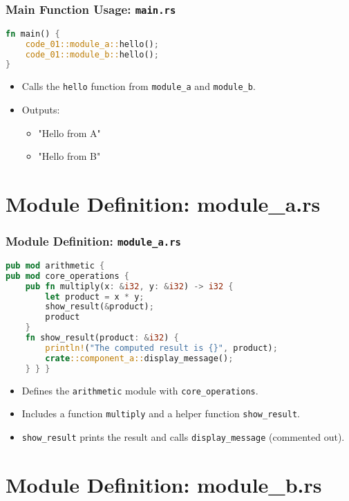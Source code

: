 \documentclass[aspectratio=169, table]{beamer}
\begin{document}
\begin{frame}[fragile]
\frametitle{Main Function Usage: \texttt{main.rs}}
\begin{lstlisting}[language=Rust]
fn main() { 
	code_01::module_a::hello();
	code_01::module_b::hello(); 
}
\end{lstlisting}
\begin{itemize}
\item Calls the \texttt{hello} function from \texttt{module\_a} and \texttt{module\_b}.
\item Outputs:
\begin{itemize}
	\item "Hello from A"
	\item "Hello from B"
\end{itemize}
\end{itemize}
\end{frame}

\section{Module Definition: module\_a.rs}
\begin{frame}[fragile]
\frametitle{Module Definition: \texttt{module\_a.rs}}
\vspace{15pt}
\begin{lstlisting}[language=Rust]
pub mod arithmetic {
pub mod core_operations {
	pub fn multiply(x: &i32, y: &i32) -> i32 {
		let product = x * y;
		show_result(&product);
		product
	}
	fn show_result(product: &i32) {
		println!("The computed result is {}", product);
		crate::component_a::display_message();
	} } }
\end{lstlisting}
\begin{itemize}
\item Defines the \texttt{arithmetic} module with \texttt{core\_operations}.
\item Includes a function \texttt{multiply} and a helper function \texttt{show\_result}.
\item \texttt{show\_result} prints the result and calls \texttt{display\_message} (commented out).
\end{itemize}
\end{frame}

\section{Module Definition: module\_b.rs}
\end{document}
